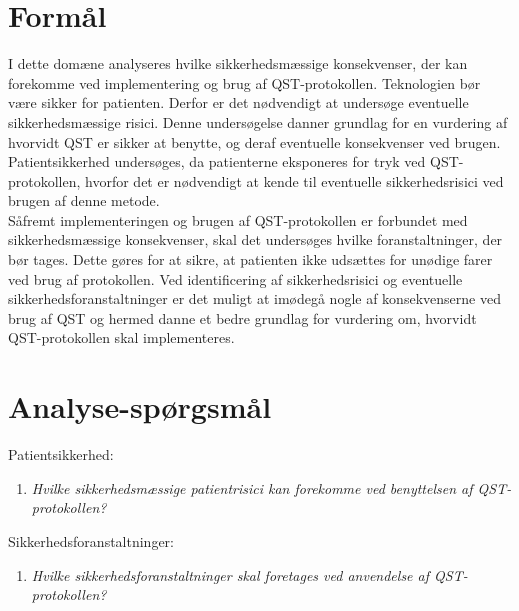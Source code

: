 \section{Formål} 
I dette domæne analyseres hvilke sikkerhedsmæssige konsekvenser, der kan forekomme ved implementering og brug af QST-protokollen. Teknologien bør være sikker for patienten. Derfor er det nødvendigt at undersøge eventuelle sikkerhedsmæssige risici. Denne undersøgelse danner grundlag for en vurdering af hvorvidt QST er sikker at benytte, og deraf eventuelle konsekvenser ved brugen. \\
Patientsikkerhed undersøges, da patienterne eksponeres for tryk ved QST-protokollen, hvorfor det er nødvendigt at kende til eventuelle sikkerhedsrisici ved brugen af denne metode. \\
Såfremt implementeringen og brugen af QST-protokollen er forbundet med sikkerhedsmæssige konsekvenser, skal det undersøges hvilke foranstaltninger, der bør tages. Dette gøres for at sikre, at patienten ikke udsættes for unødige farer ved brug af protokollen. Ved identificering af sikkerhedsrisici og eventuelle sikkerhedsforanstaltninger er det muligt at imødegå nogle af konsekvenserne ved brug af QST og hermed danne et bedre grundlag for vurdering om, hvorvidt QST-protokollen skal implementeres.

\section{Analyse-spørgsmål}
Patientsikkerhed:
\begin{enumerate}
\item \textit{Hvilke sikkerhedsmæssige patientrisici kan forekomme ved benyttelsen af QST-protokollen?} %
\end{enumerate}
Sikkerhedsforanstaltninger:
\begin{enumerate}[resume]
\item \textit{Hvilke sikkerhedsforanstaltninger skal foretages ved anvendelse af QST-protokollen?}  %
\end{enumerate}

